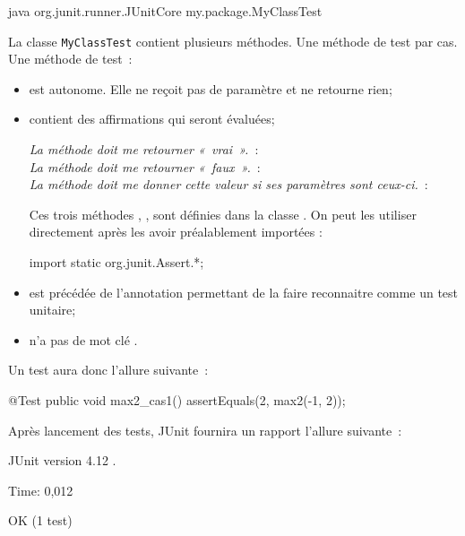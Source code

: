 \begin{term}
	java org.junit.runner.JUnitCore my.package.MyClassTest
\end{term}

La classe \texttt{MyClassTest} contient plusieurs méthodes. Une méthode de test
par cas. Une méthode de test~: 

\begin{itemize}
	\item est autonome. Elle ne reçoit pas de paramètre et ne retourne rien;
	
	\item contient des affirmations qui seront évaluées;

		\textit{La méthode doit me retourner «~vrai~».}~: \\
		\textit{La méthode doit me retourner «~faux~».}~: \\
		\textit{La méthode doit me donner cette valeur si ses paramètres sont
		ceux-ci.}~:\\

              Ces trois méthodes , ,  sont définies dans la classe .
              On peut les utiliser directement après les avoir préalablement importées :
\begin{java}
import static org.junit.Assert.*;
\end{java}
              

	\item est précédée de l'annotation  permettant de la faire
		reconnaitre comme un test unitaire;

	\item n'a pas de mot clé .

\end{itemize}

Un test aura donc l'allure suivante~:

\begin{java}
@Test
public void max2_cas1(){
	assertEquals(2, max2(-1, 2));
}
\end{java}

Après lancement des tests, JUnit fournira un rapport l'allure suivante~:

\begin{term}
JUnit version 4.12
.

Time: 0,012

OK (1 test)
\end{term}

